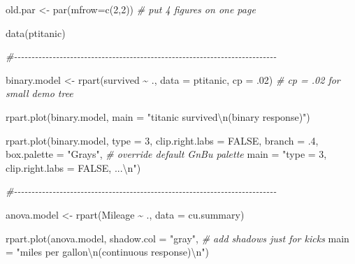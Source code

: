 \documentclass[
]{book}
\newenvironment{Shaded}{\begin{snugshade}}{\end{snugshade}}
\newcommand{\AttributeTok}[1]{\textcolor[rgb]{0.77,0.63,0.00}{#1}}
\newcommand{\CommentTok}[1]{\textcolor[rgb]{0.56,0.35,0.01}{\textit{#1}}}
\newcommand{\ConstantTok}[1]{\textcolor[rgb]{0.00,0.00,0.00}{#1}}
\newcommand{\DecValTok}[1]{\textcolor[rgb]{0.00,0.00,0.81}{#1}}
\newcommand{\FunctionTok}[1]{\textcolor[rgb]{0.00,0.00,0.00}{#1}}
\newcommand{\NormalTok}[1]{#1}
\newcommand{\OtherTok}[1]{\textcolor[rgb]{0.56,0.35,0.01}{#1}}
\newcommand{\SpecialCharTok}[1]{\textcolor[rgb]{0.00,0.00,0.00}{#1}}
\newcommand{\StringTok}[1]{\textcolor[rgb]{0.31,0.60,0.02}{#1}}
\begin{document}
\begin{Shaded}
\begin{Highlighting}[]
\NormalTok{old.par }\OtherTok{\textless{}{-}} \FunctionTok{par}\NormalTok{(}\AttributeTok{mfrow=}\FunctionTok{c}\NormalTok{(}\DecValTok{2}\NormalTok{,}\DecValTok{2}\NormalTok{))            }\CommentTok{\# put 4 figures on one page}

\FunctionTok{data}\NormalTok{(ptitanic)}

\CommentTok{\#{-}{-}{-}{-}{-}{-}{-}{-}{-}{-}{-}{-}{-}{-}{-}{-}{-}{-}{-}{-}{-}{-}{-}{-}{-}{-}{-}{-}{-}{-}{-}{-}{-}{-}{-}{-}{-}{-}{-}{-}{-}{-}{-}{-}{-}{-}{-}{-}{-}{-}{-}{-}{-}{-}{-}{-}{-}{-}{-}{-}{-}{-}{-}{-}{-}{-}{-}{-}{-}{-}{-}{-}{-}{-}{-}}

\NormalTok{binary.model }\OtherTok{\textless{}{-}} \FunctionTok{rpart}\NormalTok{(survived }\SpecialCharTok{\textasciitilde{}}\NormalTok{ ., }\AttributeTok{data =}\NormalTok{ ptitanic, }\AttributeTok{cp =}\NormalTok{ .}\DecValTok{02}\NormalTok{)}
                                        \CommentTok{\# cp = .02 for small demo tree}

\FunctionTok{rpart.plot}\NormalTok{(binary.model,}
           \AttributeTok{main =} \StringTok{"titanic survived}\SpecialCharTok{\textbackslash{}n}\StringTok{(binary response)"}\NormalTok{)}

\FunctionTok{rpart.plot}\NormalTok{(binary.model, }\AttributeTok{type =} \DecValTok{3}\NormalTok{, }\AttributeTok{clip.right.labs =} \ConstantTok{FALSE}\NormalTok{,}
           \AttributeTok{branch =}\NormalTok{ .}\DecValTok{4}\NormalTok{,}
           \AttributeTok{box.palette =} \StringTok{"Grays"}\NormalTok{,       }\CommentTok{\# override default GnBu palette}
           \AttributeTok{main =} \StringTok{"type = 3, clip.right.labs = FALSE, ...}\SpecialCharTok{\textbackslash{}n}\StringTok{"}\NormalTok{)}

\CommentTok{\#{-}{-}{-}{-}{-}{-}{-}{-}{-}{-}{-}{-}{-}{-}{-}{-}{-}{-}{-}{-}{-}{-}{-}{-}{-}{-}{-}{-}{-}{-}{-}{-}{-}{-}{-}{-}{-}{-}{-}{-}{-}{-}{-}{-}{-}{-}{-}{-}{-}{-}{-}{-}{-}{-}{-}{-}{-}{-}{-}{-}{-}{-}{-}{-}{-}{-}{-}{-}{-}{-}{-}{-}{-}{-}{-}}

\NormalTok{anova.model }\OtherTok{\textless{}{-}} \FunctionTok{rpart}\NormalTok{(Mileage }\SpecialCharTok{\textasciitilde{}}\NormalTok{ ., }\AttributeTok{data =}\NormalTok{ cu.summary)}

\FunctionTok{rpart.plot}\NormalTok{(anova.model,}
           \AttributeTok{shadow.col =} \StringTok{"gray"}\NormalTok{,         }\CommentTok{\# add shadows just for kicks}
           \AttributeTok{main =} \StringTok{"miles per gallon}\SpecialCharTok{\textbackslash{}n}\StringTok{(continuous response)}\SpecialCharTok{\textbackslash{}n}\StringTok{"}\NormalTok{)}


\end{Highlighting}
\end{Shaded}
\end{document}
